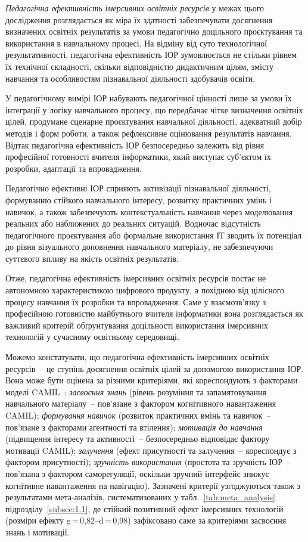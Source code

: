 \emph{Педагогічна ефективність імерсивних освітніх ресурсів} у межах цього дослідження розглядається як міра їх здатності забезпечувати досягнення визначених освітніх результатів за умови педагогічно доцільного проєктування та використання в навчальному процесі. На відміну від суто технологічної результативності, педагогічна ефективність ІОР зумовлюється не стільки рівнем їх технічної складності, скільки відповідністю дидактичним цілям, змісту навчання та особливостям пізнавальної діяльності здобувачів освіти.

У педагогічному вимірі ІОР набувають педагогічної цінності лише за умови їх інтеграції у логіку навчального процесу, що передбачає чітке визначення освітніх цілей, продумане сценарне проєктування навчальної діяльності, адекватний добір методів і форм роботи, а також рефлексивне оцінювання результатів навчання. Відтак педагогічна ефективність ІОР безпосередньо залежить від рівня професійної готовності вчителя інформатики, який виступає суб'єктом їх розробки, адаптації та впровадження.

Педагогічно ефективні ІОР сприяють активізації пізнавальної діяльності, формуванню стійкого навчального інтересу, розвитку практичних умінь і навичок, а також забезпечують контекстуальність навчання через моделювання реальних або наближених до реальних ситуацій. Водночас відсутність педагогічного проєктування або формальне використання ІТ зводить їх потенціал до рівня візуального доповнення навчального матеріалу, не забезпечуючи суттєвого впливу на якість освітніх результатів.

Отже, педагогічна ефективність імерсивних освітніх ресурсів постає не автономною характеристикою цифрового продукту, а похідною від цілісного процесу навчання їх розробки та впровадження. Саме у взаємозв'язку з професійною готовністю майбутнього вчителя інформатики вона розглядається як важливий критерій обґрунтування доцільності використання імерсивних технологій у сучасному освітньому середовищі.

Можемо констатувати, що педагогічна ефективність імерсивних освітніх ресурсів~-- це ступінь досягнення освітніх цілей за допомогою використання ІОР. Вона може бути оцінена за різними критеріями, які кореспондують з факторами моделі CAMIL~\cite{Makransky2021CAMIL}: \emph{засвоєння знань} (рівень розуміння та запам\textquotesingle ятовування навчального матеріалу~-- пов'язане з фактором когнітивного навантаження CAMIL); \emph{формування навичок} (розвиток практичних вмінь та навичок~-- пов'язане з факторами агентності та втілення); \emph{мотивація до навчання} (підвищення інтересу та активності~-- безпосередньо відповідає фактору мотивації CAMIL); \emph{залучення} (ефект присутності та залучення~-- кореспондує з фактором присутності); \emph{зручність використання} (простота та зручність ІОР~-- пов'язана з фактором саморегуляції, оскільки зручний інтерфейс знижує когнітивне навантаження на навігацію). Зазначені критерії узгоджуються також з результатами мета-аналізів, систематизованих у табл.~\ref{tab:meta_analysis} підрозділу~\ref{subsec:1.1}, де стійкий позитивний ефект імерсивних технологій (розміри ефекту g\,=\,0{,}82--d\,=\,0{,}98) зафіксовано саме за критеріями засвоєння знань і мотивації.


